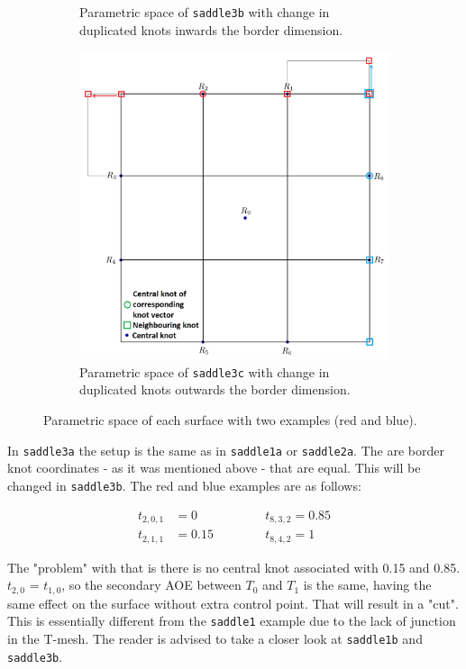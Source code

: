 \documentclass{article}
\begin{document}
\begin{figure}[H]
\begin{subfigure}[b]{0.31\textwidth}
\caption{Parametric space of \texttt{saddle3b} with change in duplicated knots inwards the border dimension.}
\label{saddle3bp}
\end{subfigure}
\begin{subfigure}[b]{0.34\textwidth}
\includegraphics[width=\textwidth]{saddle3cparam}
\caption{Parametric space of \texttt{saddle3c} with change in duplicated knots outwards the border dimension.}
\label{saddle3cp}
\end{subfigure}
\caption{Parametric space of each surface with two examples (red and blue).}
\label{saddle3p}
\end{figure}

In \texttt{saddle3a} the setup is the same as in \texttt{saddle1a} or \texttt{saddle2a}. The are border knot coordinates - as it was mentioned above - that are equal. This will be changed in \texttt{saddle3b}. The red and blue examples are as follows:

\begin{equation}
\begin{split}
t_{2, 0, 1} & = 0 \phantom{0.15wwwww} t_{8, 3, 2} = 0.85 \\
t_{2, 1, 1} & = 0.15 \phantom{0wwwww} t_{8, 4, 2} = 1
\end{split}
\end{equation}

The "problem" with that is there is no central knot associated with 0.15 and 0.85. $t_{2, 0}$ = $t_{1, 0}$, so the secondary AOE between $T_{0}$ and $T_{1}$ is the same, having the same effect on the surface without extra control point. That will result in a "cut". This is essentially different from the \texttt{saddle1} example due to the lack of junction in the T-mesh. The reader is advised to take a closer look at \texttt{saddle1b} and \texttt{saddle3b}.
\end{document}
